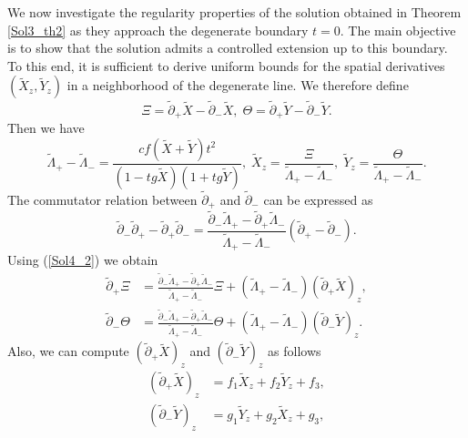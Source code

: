 \documentclass[3p,11pt]{elsarticle}
\numberwithin{equation}{section}
\begin{document}
We now investigate the regularity properties of the solution obtained in
Theorem \ref{Sol3_th2} as they approach the degenerate boundary $t=0$.
The main objective is to show that the solution admits a controlled extension
up to this boundary. To this end, it is sufficient to derive uniform bounds
for the spatial derivatives $(\widetilde X_z,\widetilde Y_z)$ in a neighborhood of
the degenerate line. We therefore define
\begin{equation*}\label{Sol4_1}
    \Xi=\tilde\partial_+\widetilde X-\tilde\partial_-\widetilde X,\; \Theta=\tilde\partial_+\widetilde Y-\tilde\partial_-\widetilde Y.
\end{equation*}
Then we have
\begin{equation}\label{Sol4_2}
    \tilde \Lambda_+-\tilde \Lambda_-=\frac{cf(\widetilde X+\widetilde Y)t^2}{(1-tg\widetilde X)(1+tg\widetilde Y)},\; \widetilde X_z=\frac{\Xi}{\tilde \Lambda_+-\tilde \Lambda_-}, \; \widetilde Y_z=\frac{\Theta}{\tilde \Lambda_+-\tilde \Lambda_-}.
\end{equation}
The commutator relation between $\tilde\partial_+$ and $\tilde\partial_-$ can be expressed as \cite{Jliinteraction2009}
\begin{equation*}\label{Sol4_3}
    \tilde\partial_-\tilde\partial_+-\tilde\partial_+\tilde\partial_-=\frac{\tilde\partial_-\tilde \Lambda_+-\tilde\partial_+\tilde \Lambda_-}{\tilde \Lambda_+-\tilde \Lambda_-}(\tilde\partial_+-\tilde\partial_-).
\end{equation*}
Using (\ref{Sol4_2}) we obtain
\begin{equation}\label{Sol4_4}
    \begin{split}
        \tilde\partial_+\Xi&=\frac{\tilde\partial_-\tilde\Lambda_+-\tilde\partial_+\tilde\Lambda_-}{\tilde\Lambda_+-\tilde\Lambda_-}\Xi+(\tilde\Lambda_+-\tilde\Lambda_-)(\tilde\partial_+\widetilde X)_z,\\
        \tilde\partial_-\Theta&=\frac{\tilde\partial_-\tilde\Lambda_+-\tilde\partial_+\tilde\Lambda_-}{\tilde\Lambda_+-\tilde\Lambda_-}\Theta+(\tilde\Lambda_+-\tilde\Lambda_-)(\tilde\partial_-\widetilde Y)_z.
    \end{split}
\end{equation}
Also, we can compute $(\tilde\partial_+\widetilde X)_z$ and $(\tilde\partial_-\widetilde Y)_z$ as follows
\begin{equation}\label{Sol4_5}
    \begin{split}
        (\tilde\partial_+\widetilde X)_z&=f_1\widetilde X_z+f_2\widetilde Y_z+f_3,\\
        (\tilde\partial_-\widetilde Y)_z&=g_1\widetilde Y_z+g_2\widetilde X_z+g_3,\\
    \end{split}
\end{equation}
\end{document}
